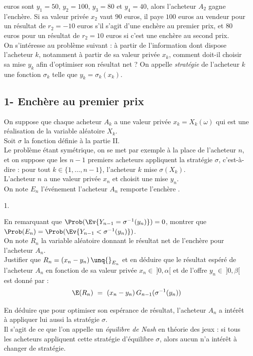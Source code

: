 \documentclass[11pt]{article}%
\begin{document}
euros sont $y_1=50$, $y_2=100$, $y_3=80$ et $y_4=40$, alors l'acheteur 
$A_2$ gagne l'enchère. Si sa valeur privée $x_2$ vaut $90$ euros, il 
paye $100$ euros au vendeur pour un résultat de $r_2=-10$ euros s'il 
s'agit d'une enchère au premier prix, et $80$ euros pour un résultat de 
$r_2=10$ euros si c'est une enchère au second prix.\\
On s'intéresse au problème suivant : à partir de l'information dont 
dispose l'acheteur $k$, notamment à partir de sa valeur privée $x_k$, 
comment doit-il choisir sa mise $y_k$ afin d'optimiser son résultat net 
? On appelle \emph{stratégie} de l'acheteur $k$ une fonction $\sigma_k$ 
telle que $y_k = \sigma_k(x_k)$.



\subsection*{1- Enchère au premier prix}

\noindent
On suppose que chaque acheteur $A_k$ a une valeur privée $x_k = 
X_k(\omega)$ qui est une réalisation de la variable aléatoire $X_k$.\\
Soit $\sigma$ la fonction définie à la partie II.\\
Le problème étant symétrique, on se met par exemple à la place de 
l'acheteur $n$, et on suppose que les $n-1$ premiers acheteurs 
appliquent la stratégie $\sigma$, c'est-à-dire : pour tout $k\in \{1, 
\ldots, n-1\}$, l'acheteur $k$ mise $\sigma(X_k)$.\\
L'acheteur $n$ a une valeur privée $x_n$ et choisit une mise $y_n$.\\
On note $E_n$ l'événement \og l'acheteur $A_n$ remporte l'enchère \fg{}.
\begin{noliste}{1.}
  \setlength{\itemsep}{4mm}
  \setcounter{enumi}{9}
  \item En remarquant que $\Prob(\Ev{Y_{n-1} = \sigma^{-1}(y_n)}) = 0$,
  montrer que $\Prob(E_n) = \Prob(\Ev{Y_{n-1} < \sigma^{-1}(y_n)})$.\\
  On note $R_n$ la variable aléatoire donnant le résultat net de 
  l'enchère pour l'acheteur $A_n$.\\
  Justifier que $R_n = (x_n-y_n) \, \unq{}_{E_n}$ et en déduire que le 
  résultat espéré de l'acheteur $A_n$ en fonction de sa valeur 
  privée $x_n \in \ ]0,\alpha[$ et de l'offre $y_n \in \ ]0,\beta[$ 
  est donné par :
  \[
    \E(R_n) \ = \ (x_n-y_n) \, G_{n-1}(\sigma^{-1}(y_n))
  \]
  
  
  
  
  
  
  \item En déduire que pour optimiser son espérance de résultat, 
  l'acheteur $A_n$ a intérêt à appliquer lui aussi la stratégie 
  $\sigma$.\\
  Il s'agit de ce que l'on appelle un \emph{équilibre de Nash} en 
  théorie des jeux : si tous les acheteurs appliquent cette 
  stratégie d'équilibre $\sigma$, alors aucun n'a intérêt à 
  changer de stratégie.
  
  
\end{noliste}
\end{document}
